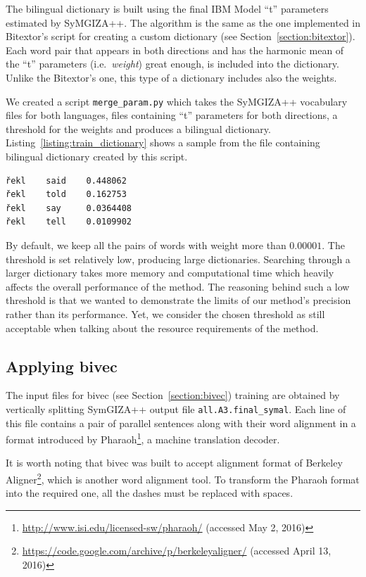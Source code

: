 The bilingual dictionary is built using the final IBM Model ``t'' parameters estimated by SyMGIZA++. The algorithm is the same as the one implemented in Bitextor's script for creating a custom dictionary (see Section~\ref{section:bitextor}). Each word pair that appears in both directions and has the harmonic mean of the ``t'' parameters (i.e.\ \textit{weight}) great enough, is included into the dictionary. Unlike the Bitextor's one, this type of a dictionary includes also the weights.

We created a script \texttt{merge\_param.py} which takes the SyMGIZA++ vocabulary files for both languages, files containing ``t'' parameters for both directions, a threshold for the weights and produces a bilingual dictionary. Listing~\ref{listing:train_dictionary} shows a sample from the file containing bilingual dictionary created by this script.

\begin{lstlisting}[float=!htb,caption={Sample from a file with bilingual dictionary (training)},label={listing:train_dictionary},firstnumber=170724]
řekl	said	0.448062
řekl	told	0.162753
řekl	say		0.0364408
řekl	tell	0.0109902
\end{lstlisting}

By default, we keep all the pairs of words with weight more than $0.00001$. The threshold is set relatively low, producing large dictionaries. Searching through a larger dictionary takes more memory and computational time which heavily affects the overall performance of the method. The reasoning behind such a low threshold is that we wanted to demonstrate the limits of our method's precision rather than its performance. Yet, we consider the chosen threshold as still acceptable when talking about the resource requirements of the method.

\subsection{Applying bivec}
\label{subsection:applying_bivec}

The input files for bivec (see Section~\ref{section:bivec}) training are obtained by vertically splitting SymGIZA++ output file \texttt{all.A3.final\_symal}. Each line of this file contains a pair of parallel sentences along with their word alignment in a format introduced by Pharaoh\footnote{\url{http://www.isi.edu/licensed-sw/pharaoh/} (accessed May 2, 2016)}, a machine translation decoder. 

It is worth noting that bivec was built to accept alignment format of Berkeley Aligner\footnote{\url{https://code.google.com/archive/p/berkeleyaligner/} (accessed April 13, 2016)}, which is another word alignment tool. To transform the Pharaoh format into the required one, all the dashes must be replaced with spaces.

